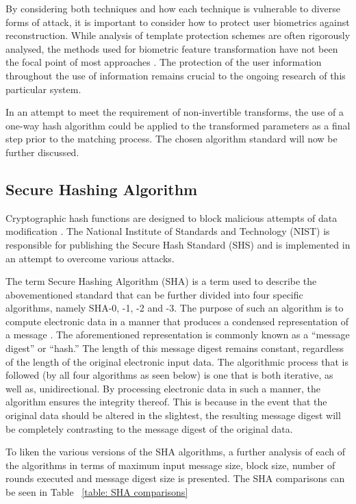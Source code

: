     
    By considering both techniques and how each technique is vulnerable to diverse forms of attack, it is important to consider how to protect user biometrics against reconstruction. While analysis of template protection schemes are often rigorously analysed, the methods used for biometric feature transformation have not been the focal point of most approaches \cite{Nagar2009}. The protection of the user information throughout the use of information remains crucial to the ongoing research of this particular system. 
    
    In an attempt to meet the requirement of non-invertible transforms, the use of a one-way hash algorithm could be applied to the transformed parameters as a final step prior to the matching process. The chosen algorithm standard will now be further discussed.

    \subsection{ Secure Hashing Algorithm}
    
    Cryptographic hash functions are designed to block malicious attempts of data modification \cite{Pfleeger2015}. The National Institute of Standards and Technology (NIST) is responsible for publishing the Secure Hash Standard (SHS) and is implemented in an attempt to overcome various attacks. 
    
    The term Secure Hashing Algorithm (SHA) is a term used to describe the abovementioned standard that can be further divided into four specific algorithms, namely SHA-0, -1, -2 and -3. The purpose of such an algorithm is to compute electronic data in a manner that produces a condensed representation of a message \cite{Foti2015}. The aforementioned representation is commonly known as a “message digest” or “hash.” The length of this message digest remains constant, regardless of the length of the original electronic input data. The algorithmic process that is followed (by all four algorithms as seen below) is one that is both iterative, as well as, unidirectional. By processing electronic data in such a manner, the algorithm ensures the integrity thereof. This is because in the event that the original data should be altered in the slightest, the resulting message digest will be completely contrasting to the message digest of the original data. 
    
    To liken the various versions of the SHA algorithms, a further analysis of each of the algorithms in terms of maximum input message size, block size, number of rounds executed and message digest size is presented. The SHA comparisons can be seen in Table ~\ref{table: SHA comparisons}
    
